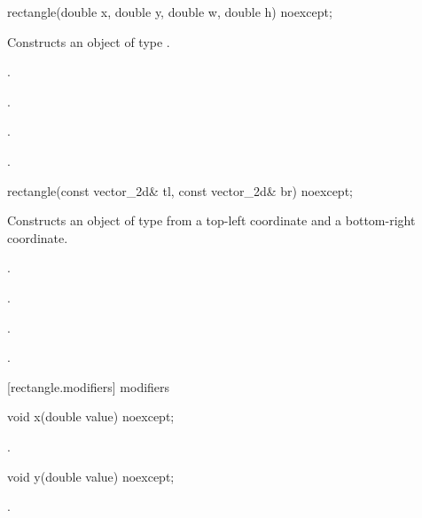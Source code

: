 \begin{itemdecl}
rectangle(double x, double y, double w, double h) noexcept;
\end{itemdecl}
\begin{itemdescr}
	\pnum
	\effects
	Constructs an object of type .
	
	\pnum
	\postconditions
	.
	
	\pnum
	.
	
	\pnum
	.
	
	\pnum
	.
	
\end{itemdescr}

\begin{itemdecl}
rectangle(const vector_2d& tl, const vector_2d& br) noexcept;
\end{itemdecl}
\begin{itemdescr}
	\pnum
	\effects
	Constructs an object of type  from a top-left coordinate and a bottom-right coordinate.
	
	\pnum
	\postconditions
	.
	
	\pnum
	.
	
	\pnum
	.
	
	\pnum
	.
	
\end{itemdescr}

 [rectangle.modifiers]{ modifiers}

\begin{itemdecl}
void x(double value) noexcept;
\end{itemdecl}

\begin{itemdescr}
	\pnum
	\postconditions
	.

\end{itemdescr}

\begin{itemdecl}
void y(double value) noexcept;
\end{itemdecl}
\begin{itemdescr}
	\pnum
	\postconditions
	.

\end{itemdescr}

